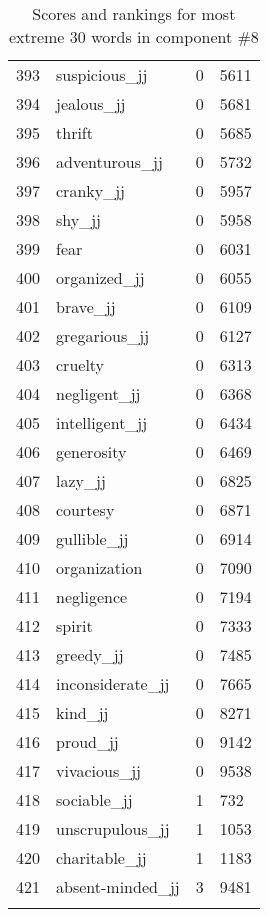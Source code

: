 \begin{longtable}[!htbp]{| rlr@{.}l |}
    393 & suspicious\_jj & 0 & 5611 \\
    394 & jealous\_jj & 0 & 5681 \\
    395 & thrift & 0 & 5685 \\
    396 & adventurous\_jj & 0 & 5732 \\
    397 & cranky\_jj & 0 & 5957 \\
    398 & shy\_jj & 0 & 5958 \\
    399 & fear & 0 & 6031 \\
    400 & organized\_jj & 0 & 6055 \\
    401 & brave\_jj & 0 & 6109 \\
    402 & gregarious\_jj & 0 & 6127 \\
    403 & cruelty & 0 & 6313 \\
    404 & negligent\_jj & 0 & 6368 \\
    405 & intelligent\_jj & 0 & 6434 \\
    406 & generosity & 0 & 6469 \\
    407 & lazy\_jj & 0 & 6825 \\
    408 & courtesy & 0 & 6871 \\
    409 & gullible\_jj & 0 & 6914 \\
    410 & organization & 0 & 7090 \\
    411 & negligence & 0 & 7194 \\
    412 & spirit & 0 & 7333 \\
    413 & greedy\_jj & 0 & 7485 \\
    414 & inconsiderate\_jj & 0 & 7665 \\
    415 & kind\_jj & 0 & 8271 \\
    416 & proud\_jj & 0 & 9142 \\
    417 & vivacious\_jj & 0 & 9538 \\
    418 & sociable\_jj & 1 & 732 \\
    419 & unscrupulous\_jj & 1 & 1053 \\
    420 & charitable\_jj & 1 & 1183 \\
    421 & absent-minded\_jj & 3 & 9481 \\
    \hline
    \caption{Scores and rankings for most extreme 30 words in component \#8} \\
\end{longtable}
